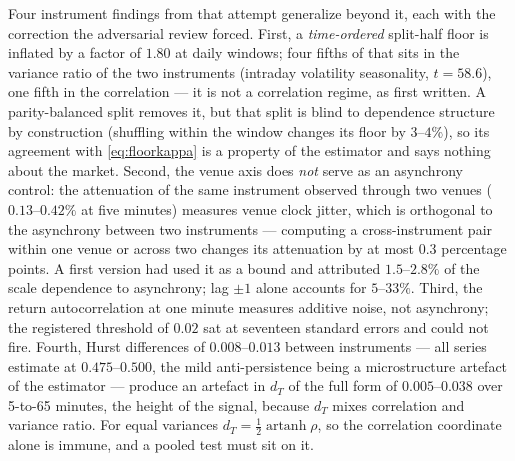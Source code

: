 \documentclass[11pt,a4paper]{article}
\numberwithin{equation}{section}
\begin{document}
Four instrument findings from that attempt generalize beyond it,
each with the correction the adversarial review forced. First, a
\emph{time-ordered} split-half floor is inflated by a factor of
$1.80$ at daily windows; four fifths of that sits in the variance
ratio of the two instruments (intraday volatility seasonality,
$t=58.6$), one fifth in the correlation --- it is not a correlation
regime, as first written. A parity-balanced split removes it, but
that split is blind to dependence structure by construction
(shuffling within the window changes its floor by $3$--$4\%$), so its
agreement with \eqref{eq:floorkappa} is a property of the estimator
and says nothing about the market. Second, the venue axis does
\emph{not} serve as an asynchrony control: the attenuation of the
same instrument observed through two venues ($0.13$--$0.42\%$ at
five minutes) measures venue clock jitter, which is orthogonal to
the asynchrony between two instruments --- computing a
cross-instrument pair within one venue or across two changes its
attenuation by at most $0.3$ percentage points. A first version
had used it as a bound and attributed $1.5$--$2.8\%$ of the scale
dependence to asynchrony; lag $\pm1$ alone accounts for
$5$--$33\%$. Third, the return autocorrelation at one minute
measures additive noise, not asynchrony; the registered threshold
of $0.02$ sat at seventeen standard errors and could not fire.
Fourth, Hurst differences of $0.008$--$0.013$ between instruments
--- all series estimate at $0.475$--$0.500$, the mild
anti-persistence being a microstructure artefact of the estimator
--- produce an artefact in $d_T$ of the full form of
$0.005$--$0.038$ over 5-to-65 minutes, the height of the signal,
because $d_T$ mixes correlation and variance ratio. For equal
variances $d_T=\tfrac12\operatorname{artanh}\rho$, so the
correlation coordinate alone is immune, and a pooled test must sit
on it.
\end{document}
